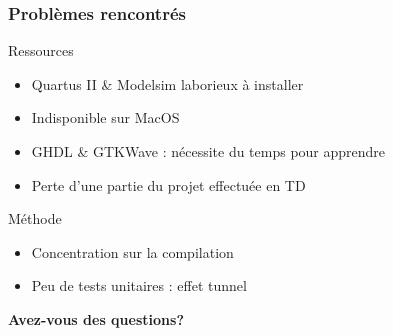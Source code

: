 \documentclass{beamer}
\begin{document}
\begin{frame}
\frametitle{Problèmes rencontrés}
\begin{block}{Ressources}
	\begin{itemize}
		\item Quartus II \& Modelsim laborieux à installer
		\item Indisponible sur MacOS
		\item GHDL \& GTKWave : nécessite du temps pour apprendre
		\item Perte d'une partie du projet effectuée en TD
	\end{itemize}
\end{block}
\begin{block}{Méthode}
	\begin{itemize}
		\item Concentration sur la compilation
		\item Peu de tests unitaires : effet tunnel
	\end{itemize}
\end{block}
\end{frame}


\begin{frame}
\begin{center}
	{\Large \textbf{Avez-vous des questions?}}
\end{center}
\end{frame}



\end{document}
